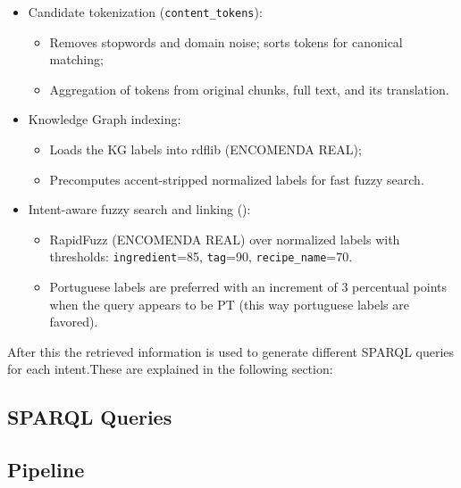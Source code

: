 \documentclass[conference]{IEEEtran}
\begin{document}
\begin{itemize}
  \item Candidate tokenization (\texttt{content\_tokens}):
    \begin{itemize}
      \item Removes stopwords and domain noise; sorts tokens for canonical matching;
      \item Aggregation of tokens from original chunks, full text, and its translation.
    \end{itemize}

  \item Knowledge Graph indexing:
    \begin{itemize}
      \item Loads the KG labels into rdflib (ENCOMENDA REAL);
      \item Precomputes accent-stripped normalized labels for fast fuzzy search.
    \end{itemize}

  \item Intent-aware fuzzy search and linking ():
    \begin{itemize}
      \item RapidFuzz (ENCOMENDA REAL) over normalized labels with thresholds:
        \texttt{ingredient}=85, \texttt{tag}=90, \texttt{recipe\_name}=70.
      \item Portuguese labels are preferred with an increment of 3 percentual points when the query appears to be PT (this way portuguese labels are favored).
    \end{itemize}
\end{itemize}

After this the retrieved information is used to generate different SPARQL queries for each intent.These are explained in the following section: 

\subsection{SPARQL Queries}




\subsection{Pipeline}
\end{document}
